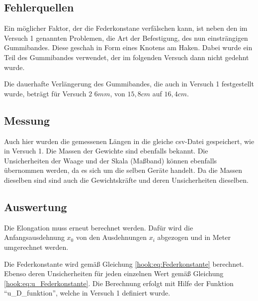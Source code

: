 \documentclass[
  9pt,
]{article}
\begin{document}
\hypertarget{fehlerquellen-1}{%
\subsection{Fehlerquellen}\label{fehlerquellen-1}}

Ein möglicher Faktor, der die Federkonstane verfälschen kann, ist neben
den im Versuch 1 genannten Problemen, die Art der Befestigung, des nun
einsträngigen Gummibandes. Diese geschah in Form eines Knotens am Haken.
Dabei wurde ein Teil des Gummibandes verwendet, der im folgenden Versuch
dann nicht gedehnt wurde.

Die dauerhafte Verlängerung des Gummibandes, die auch in Versuch 1
festgestellt wurde, beträgt für Versuch 2 \(6mm\), von \(15,8cm\) auf
\(16,4cm\).

\hypertarget{messung-1}{%
\subsection{Messung}\label{messung-1}}

Auch hier wurden die gemessenen Längen in die gleiche csv-Datei
gespeichert, wie in Versuch 1. Die Massen der Gewichte sind ebenfalls
bekannt. Die Unsicherheiten der Waage und der Skala (Maßband) können
ebenfalls übernommen werden, da es sich um die selben Geräte handelt. Da
die Massen dieselben sind sind auch die Gewichtskräfte und deren
Unsicherheiten dieselben.

\hypertarget{auswertung}{%
\subsection{Auswertung}\label{auswertung}}

Die Elongation muss erneut berechnet werden. Dafür wird die
Anfangsausdehnung \(x_0\) von den Ausdehnungen \(x_i\) abgezogen und in
Meter umgerechnet werden.

Die Federkonstante wird gemäß Gleichung \ref{hook:eq:Federkonstante}
berechnet. Ebenso deren Unsicherheiten für jeden einzelnen Wert gemäß
Gleichung \ref{hook:eq:u_Federkonstante}. Die Berechnung erfolgt mit
Hilfe der Funktion ``u\_D\_funktion'', welche in Versuch 1 definiert
wurde.
\end{document}
